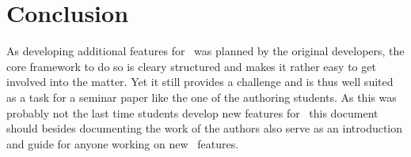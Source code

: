 
\chapter{Conclusion}

	As developing additional features for \setlx\ was planned by the original developers, the core framework to do so is cleary structured and makes it rather easy to get involved into the matter. Yet it still provides a challenge and is thus well suited as a task for a seminar paper like the one of the authoring students. As this was probably not the last time students develop new features for \setlx\, this document should besides documenting the work of the authors also serve as  an introduction and guide for anyone working on new \setlx\ features.